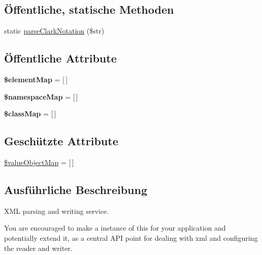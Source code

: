 \subsection*{Öffentliche, statische Methoden}
\begin{DoxyCompactItemize}
\item 
static \mbox{\hyperlink{class_sabre_1_1_xml_1_1_service_ab9ce66b271d2167755c4903d34595cb4}{parse\+Clark\+Notation}} (\$str)
\end{DoxyCompactItemize}
\subsection*{Öffentliche Attribute}
\begin{DoxyCompactItemize}
\item 
\mbox{\label{class_sabre_1_1_xml_1_1_service_a7ec72d25037edd6490e2bba3d3c6dba5}} 
{\bfseries \$element\+Map} = \mbox{[}$\,$\mbox{]}
\item 
\mbox{\label{class_sabre_1_1_xml_1_1_service_ad54ce7850cbd105f5f45157d9e49a84c}} 
{\bfseries \$namespace\+Map} = \mbox{[}$\,$\mbox{]}
\item 
\mbox{\label{class_sabre_1_1_xml_1_1_service_aad1878352603ee24e609c14d56e68a1f}} 
{\bfseries \$class\+Map} = \mbox{[}$\,$\mbox{]}
\end{DoxyCompactItemize}
\subsection*{Geschützte Attribute}
\begin{DoxyCompactItemize}
\item 
\mbox{\hyperlink{class_sabre_1_1_xml_1_1_service_af7a633198f85d799f96734e0ee43d18c}{\$value\+Object\+Map}} = \mbox{[}$\,$\mbox{]}
\end{DoxyCompactItemize}


\subsection{Ausführliche Beschreibung}
X\+ML parsing and writing service.

You are encouraged to make a instance of this for your application and potentially extend it, as a central A\+PI point for dealing with xml and configuring the reader and writer.


